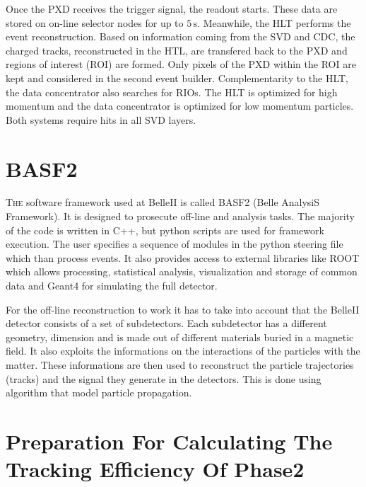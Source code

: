 \documentclass[a4paper,11pt,twosided,final,german,openbib,pdftex,listof=totoc,bibliography=totoc]{scrbook}
\begin{document}
Once the PXD receives the trigger signal, the readout starts. These data are stored on on-line selector nodes for up to $5\,\textrm{s}$. Meanwhile, the HLT performs the event reconstruction. Based on information coming from the SVD and CDC, the charged tracks, reconstructed in the HTL, are transfered back to the PXD and regions of interest (ROI) are formed. Only pixels of the PXD within the ROI are kept and considered in the second event builder. Complementarity to the HLT, the data concentrator also searches for RIOs. The HLT is optimized for high momentum and the data concentrator is optimized for low momentum particles. Both systems require hits in all SVD layers. 





\chapter{BASF2}
\label{sec:Tools}

\lettrine{T}{he} software framework used at BelleII is called BASF2 (Belle AnalysiS Framework). It is designed to prosecute off-line and analysis tasks. The majority of the code is written in C++, but python scripts are used for framework execution. The user specifies a sequence of modules in the python steering file which than process events. It also provides access to external libraries like ROOT which allows processing, statistical analysis, visualization and storage of common data and Geant4 for simulating the full detector.\cite{Moll_2011}


For the off-line reconstruction to work it has to take into account that the BelleII detector consists of a set of subdetectors. Each subdetector has a different geometry, dimension and is made out of different materials buried in a magnetic field. It also exploits the informations on the interactions of the particles with the matter. These informations are then used to reconstruct the particle trajectories (tracks) and the signal they generate in the detectors. This is done using algorithm that model particle propagation.








\chapter{Preparation  For Calculating The Tracking Efficiency Of Phase2}
\label{chap:Phase2Eff}
\end{document}
